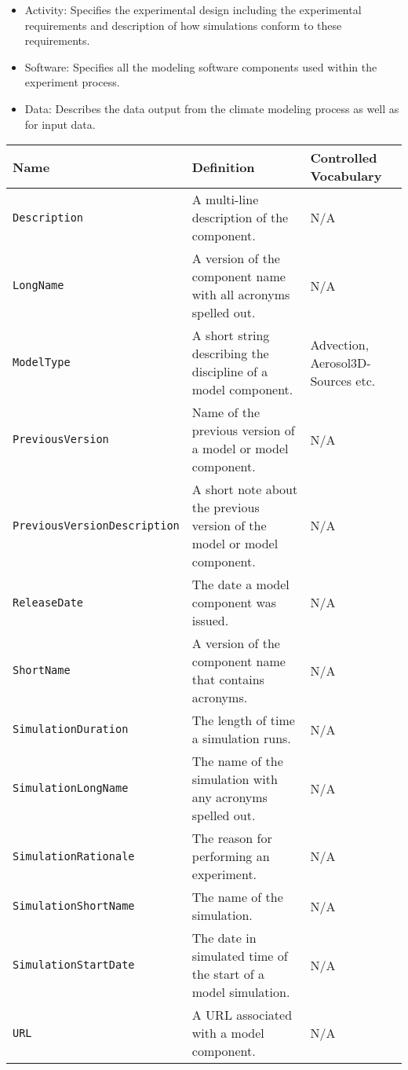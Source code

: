 \begin{itemize}
\begin{itemize}
       \item Activity: Specifies the experimental design including the experimental requirements and description of how simulations conform to these requirements.
       \item Software: Specifies all the modeling software components used within the experiment process. 
       \item Data: Describes the data output from the climate modeling process as well as for input data. 
    \end{itemize}
\end{itemize}

\begin{tabular}{|p{6cm}|p{10cm}|p{10cm}}
     {\bf Name} & {\bf Definition} & {\bf Controlled Vocabulary}\\
     \hline\hline
     {\tt Description} & A multi-line description of the component. & N/A \\
     {\tt LongName} & A version of the component name with all acronyms spelled out. & N/A\\
     {\tt ModelType} & A short string describing the discipline of a model component. & Advection, Aerosol3D-Sources etc.\\
     {\tt PreviousVersion} & Name of the previous version of a model or model component. & N/A\\ 
     {\tt PreviousVersionDescription} &  A short note about the previous version of the model or model component. & N/A \\ 
     {\tt ReleaseDate} & The date a model component was issued. & N/A \\
     {\tt ShortName} & A version of the component name that contains acronyms. & N/A \\
     {\tt SimulationDuration} & The length of time a simulation runs. & N/A \\
     {\tt SimulationLongName} & The name of the simulation with any acronyms spelled out. & N/A \\ 
     {\tt SimulationRationale} & The reason for performing an experiment. & N/A\\
     {\tt SimulationShortName} & The name of the simulation. & N/A \\
     {\tt SimulationStartDate} & The date in simulated time of the start of a model simulation. & N/A\\ 
     {\tt URL} & A URL associated with a model component. & N/A \\
\end{tabular}

